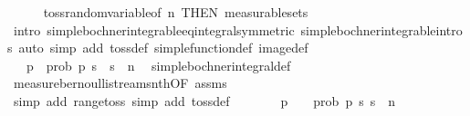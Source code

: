 \begin{isabellebody}
\ \ \ \ \isamarkupfalse%
\ toss{\isachardot}{\kern0pt}random{\isacharunderscore}{\kern0pt}variable{\isacharbrackleft}{\kern0pt}of\ n{\isacharcomma}{\kern0pt}\ THEN\ measurable{\isacharunderscore}{\kern0pt}sets{\isacharbrackright}{\kern0pt}\isanewline
\ \ \ \ \isamarkupfalse%
\ {\isacharparenleft}{\kern0pt}intro\ simple{\isacharunderscore}{\kern0pt}bochner{\isacharunderscore}{\kern0pt}integrable{\isacharunderscore}{\kern0pt}eq{\isacharunderscore}{\kern0pt}integral{\isacharbrackleft}{\kern0pt}symmetric{\isacharbrackright}{\kern0pt}\ simple{\isacharunderscore}{\kern0pt}bochner{\isacharunderscore}{\kern0pt}integrable{\isachardot}{\kern0pt}intros{\isacharparenright}{\kern0pt}\ {\isacharparenleft}{\kern0pt}auto\ simp\ add{\isacharcolon}{\kern0pt}\ toss{\isacharunderscore}{\kern0pt}def\ simple{\isacharunderscore}{\kern0pt}function{\isacharunderscore}{\kern0pt}def\ image{\isacharunderscore}{\kern0pt}def{\isacharparenright}{\kern0pt}\isanewline
\ \ \isamarkupfalse%
\ \isamarkupfalse%
\ {\isachardoublequoteopen}{\isachardot}{\kern0pt}{\isachardot}{\kern0pt}{\isachardot}{\kern0pt}\ {\isacharequal}{\kern0pt}\ p\ {\isacharminus}{\kern0pt}\ prob\ p\ {\isacharbraceleft}{\kern0pt}s{\isachardot}{\kern0pt}\ {\isasymnot}\ s\ {\isacharbang}{\kern0pt}{\isacharbang}{\kern0pt}\ n{\isacharbraceright}{\kern0pt}{\isachardoublequoteclose}\ \isamarkupfalse%
\ simple{\isacharunderscore}{\kern0pt}bochner{\isacharunderscore}{\kern0pt}integral{\isacharunderscore}{\kern0pt}def\ \isamarkupfalse%
\ measure{\isacharunderscore}{\kern0pt}bernoulli{\isacharunderscore}{\kern0pt}stream{\isacharunderscore}{\kern0pt}snth{\isacharbrackleft}{\kern0pt}OF\ assms{\isacharbrackright}{\kern0pt}\isanewline
\ \ \ \ \isamarkupfalse%
\ {\isacharparenleft}{\kern0pt}simp\ add{\isacharcolon}{\kern0pt}\ range{\isacharunderscore}{\kern0pt}toss{\isacharcomma}{\kern0pt}\ simp\ add{\isacharcolon}{\kern0pt}\ toss{\isacharunderscore}{\kern0pt}def{\isacharparenright}{\kern0pt}\isanewline
\ \ \isamarkupfalse%
\ \isamarkupfalse%
\ {\isachardoublequoteopen}{\isachardot}{\kern0pt}{\isachardot}{\kern0pt}{\isachardot}{\kern0pt}\ {\isacharequal}{\kern0pt}\ p\ {\isacharminus}{\kern0pt}\ {\isacharparenleft}{\kern0pt}{}\ {\isacharminus}{\kern0pt}\ prob\ p\ {\isacharbraceleft}{\kern0pt}s{\isachardot}{\kern0pt}\ s\ {\isacharbang}{\kern0pt}{\isacharbang}{\kern0pt}\ n{\isacharbraceright}{\kern0pt}{\isacharparenright}{\kern0pt}{\isachardoublequoteclose}\ \isamarkupfalse%

\end{isabellebody}
